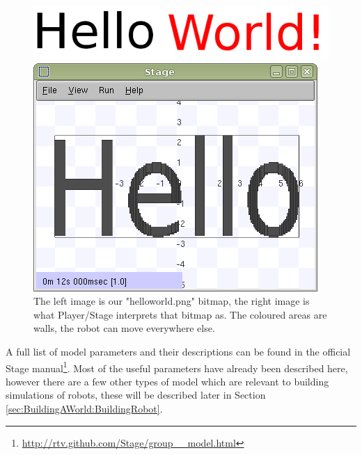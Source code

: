 \documentclass[a4paper]{report}
\newcommand{\plst}{Player/Stage\xspace}
\begin{document}
\begin{figure}
	\centering
	\begin{minipage}[c]{0.4\linewidth}
		\centering
		\includegraphics[width=\linewidth]{./pics/empty_world/writing.png}
		
	\end{minipage}%
	\hspace{0.05\linewidth}
	\begin{minipage}[c]{0.5\linewidth}
		\centering
		\includegraphics[width=\linewidth]{./pics/empty_world/helloworld.png} 
	\end{minipage}	
	\caption{The left image is our "helloworld.png" bitmap, the right image is what \plst interprets that bitmap as. The coloured areas are walls, the robot can move everywhere else.}
		\label{fig:BuildingAWorld:EmptyWorld:Models:HelloWorld}
\end{figure}

A full list of model parameters and their descriptions can be found in the official Stage manual\footnote{\url{http://rtv.github.com/Stage/group__model.html}}. Most of the useful parameters have already been described here, however there are a few other types of model which are relevant to building simulations of robots, these will be described later in Section \ref{sec:BuildingAWorld:BuildingRobot}.
\end{document}
